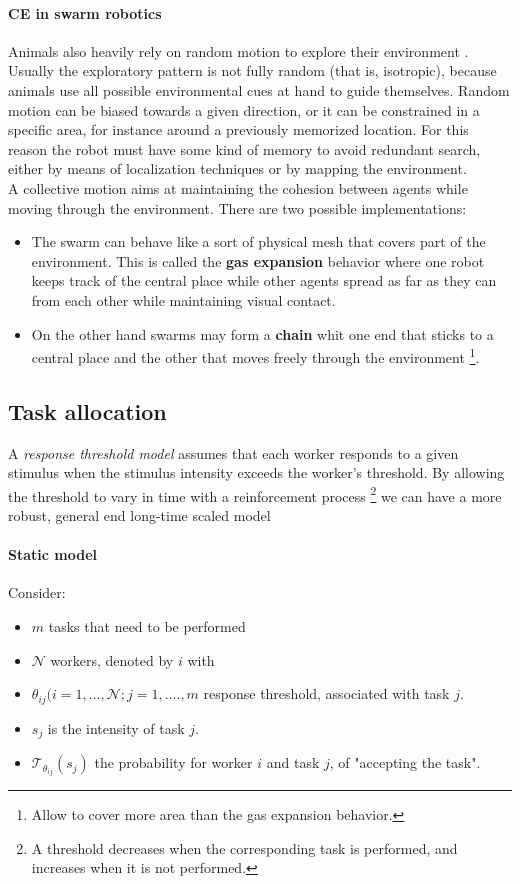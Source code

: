 \documentclass[10pt,a4paper]{article}
\begin{document}
\paragraph{CE in swarm robotics}
Animals also heavily rely on random motion to explore their environment . Usually the exploratory pattern is not fully random (that is, isotropic), because animals use all possible environmental cues at hand to guide themselves. Random motion can be biased towards a given direction, or it can be constrained in a specific area, for instance around a previously memorized location. For this reason the robot must have some kind of memory to avoid redundant search, either by means of localization techniques or by mapping the environment.\\
A collective motion aims at maintaining the cohesion between agents while moving through the environment. There are two possible implementations:
\begin{itemize}
\item The swarm can behave like a sort of physical mesh that covers part of the environment. This is called the \textbf{gas expansion} behavior where one robot keeps track of the central place while other agents spread as far as they can from each other while maintaining visual contact.
\item On the other hand swarms may form a \textbf{chain} whit one end that sticks to a central place and the other that moves freely through the environment \footnote{Allow to cover more area than the gas expansion behavior.}.
\end{itemize}


\subsection{Task allocation }
A \textit{response threshold model} assumes that each worker responds to a given stimulus when the stimulus intensity exceeds the worker's threshold. By allowing the threshold to vary in time with a reinforcement process \footnote{A threshold decreases when the corresponding task is performed, and increases when it is not performed.} we can have a more robust, general end long-time scaled model

\paragraph{Static model}
Consider:
\begin{itemize}
\item $m$ tasks that need to be performed
\item $\mathcal{N}$ workers, denoted by $i$ with
\item $\theta_{ij} (i=1,...,\mathcal{N};j=1,....,m$ response threshold, associated with task $j$.
\item $s_j$ is the intensity of task $j$.
\item $\mathcal{T}_{\theta_{ij}}(s_j)$ the probability for worker $i$ and task $j$, of "accepting the task".
\end{itemize}
\end{document}
